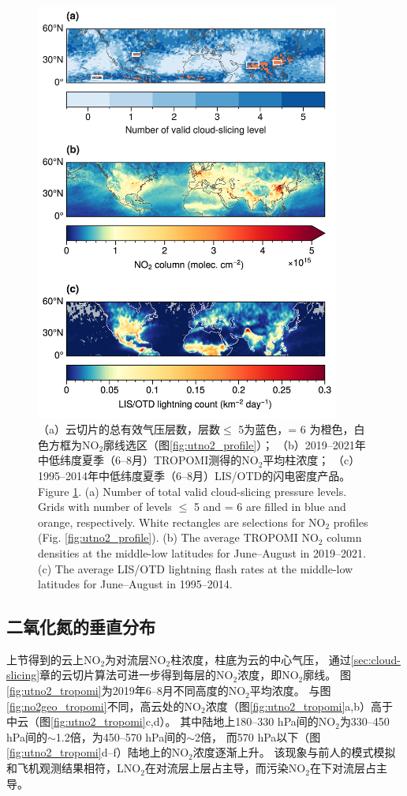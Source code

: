 \begin{figure}[!htbp]
    \centering
    \includegraphics[width=10cm]{./figures/no2_ltngcount.png}
    \caption{
    （a）云切片的总有效气压层数，层数$\leq$ 5为蓝色，= 6 为橙色，白色方框为NO$_2$廓线选区（图\ref{fig:utno2_profile}）；
    （b）2019--2021年中低纬度夏季（6--8月）TROPOMI测得的NO$_2$平均柱浓度；
    （c）1995--2014年中低纬度夏季（6--8月）LIS/OTD的闪电密度产品。 \\
    Figure \ref{fig:no2_ltngcount}. (a) Number of total valid cloud-slicing pressure levels.
    Grids with number of levels $\leq$ 5 and = 6 are filled in blue and orange, respectively.
    White rectangles are selections for NO$_2$ profiles (Fig. \ref{fig:utno2_profile}).
    (b) The average TROPOMI NO$_2$ column densities at the middle-low latitudes for June--August in 2019--2021.
    (c) The average LIS/OTD lightning flash rates at the middle-low latitudes for June--August in 1995--2014.
    }
    \label{fig:no2_ltngcount}
\end{figure}

\subsection{二氧化氮的垂直分布} \label{sec:no2_profile}


上节得到的云上NO$_2$为对流层NO$_2$柱浓度，柱底为云的中心气压，
通过\ref{sec:cloud-slicing}章的云切片算法可进一步得到每层的NO$_2$浓度，即NO$_2$廓线。
图\ref{fig:utno2_tropomi}为2019年6--8月不同高度的NO$_2$平均浓度。
与图\ref{fig:no2geo_tropomi}不同，高云处的NO$_2$浓度（图\ref{fig:utno2_tropomi}a,b）高于中云（图\ref{fig:utno2_tropomi}c,d）。
其中陆地上180--330 hPa间的NO$_2$为330--450 hPa间的$\sim$1.2倍，为450--570 hPa间的$\sim$2倍，
而570 hPa以下（图\ref{fig:utno2_tropomi}d--f）陆地上的NO$_2$浓度逐渐上升。
该现象与前人的模式模拟和飞机观测结果相符，LNO$_2$在对流层上层占主导，而污染NO$_2$在下对流层占主导\citep{Pickering.1996,Ott.2010,Laughner.2017}。


